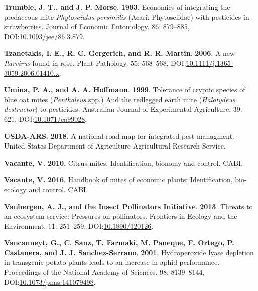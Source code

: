 \documentclass[12pt,final,CPage]{ufthesis}
\newlength{\cslhangindent}
\newenvironment{CSLReferences}[2] %
{%
	\setlength{\parindent}{0pt}
	\ifodd #1 \everypar{\setlength{\hangindent}{\cslhangindent}}\ignorespaces\fi
	\ifnum #2 > 0
	\setlength{\parskip}{#2\baselineskip}
	\fi
}%
{}
\begin{document}
{\begin{CSLReferences}{1}{0}
  \leavevmode{}%
  \textbf{Trumble, J. T., and J. P. Morse}. \textbf{1993}. Economics of integrating the predaceous mite {\emph{Phytoseiulus persimilis}} ({{Acari}: {Phytoseiidae}}) with pesticides in strawberries. Journal of Economic Entomology. 86: 879--885, DOI:\href{https://doi.org/10.1093/jee/86.3.879}{10.1093/jee/86.3.879}.

  \leavevmode{}%
  \textbf{Tzanetakis, I. E., R. C. Gergerich, and R. R. Martin}. \textbf{2006}. A new {\emph{Ilarvirus}} found in rose. Plant Pathology. 55: 568--568, DOI:\href{https://doi.org/10.1111/j.1365-3059.2006.01410.x}{10.1111/j.1365-3059.2006.01410.x}.

  \leavevmode{}%
  \textbf{Umina, P. A., and A. A. Hoffmann}. \textbf{1999}. Tolerance of cryptic species of blue oat mites ({\emph{Penthaleus}} spp.) And the redlegged earth mite ({\emph{Halotydeus destructor}}) to pesticides. Australian Journal of Experimental Agriculture. 39: 621, DOI:\href{https://doi.org/10.1071/ea99028}{10.1071/ea99028}.

  \leavevmode{}%
  \textbf{USDA-ARS}. \textbf{2018}. A national road map for integrated pest managment. {United States} Department of Agriculture-Agricultural Research Service.

  \leavevmode{}%
  \textbf{Vacante, V.} \textbf{2010}. Citrus mites: Identification, bionomy and control. CABI.

  \leavevmode{}%
  \textbf{Vacante, V.} \textbf{2016}. Handbook of mites of economic plants: Identification, bio-ecology and control. CABI.

  \leavevmode{}%
  \textbf{Vanbergen, A. J., and the Insect Pollinators Initiative}. \textbf{2013}. Threats to an ecosystem service: Pressures on pollinators. Frontiers in Ecology and the Environment. 11: 251--259, DOI:\href{https://doi.org/10.1890/120126}{10.1890/120126}.

  \leavevmode{}%
  \textbf{Vancanneyt, G., C. Sanz, T. Farmaki, M. Paneque, F. Ortego, P. Castanera, and J. J. Sanchez-Serrano}. \textbf{2001}. Hydroperoxide lyase depletion in transgenic potato plants leads to an increase in aphid performance. Proceedings of the National Academy of Sciences. 98: 8139--8144, DOI:\href{https://doi.org/10.1073/pnas.141079498}{10.1073/pnas.141079498}.


\end{CSLReferences}}
\end{document}
